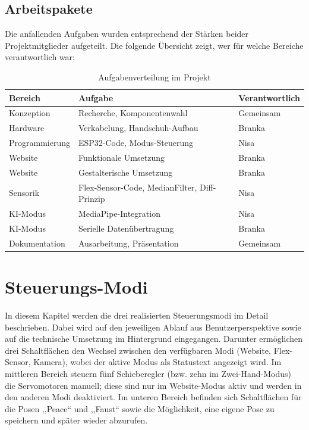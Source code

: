 \documentclass[12pt,a4paper]{article}
\begin{document}
\subsection{Arbeitspakete}
Die anfallenden Aufgaben wurden entsprechend der Stärken beider Projektmitglieder aufgeteilt. Die folgende Übersicht zeigt, wer für welche Bereiche verantwortlich war:

\begin{table}[h]
\centering
\begin{tabular}{|l|l|l|}
\hline
\textbf{Bereich} & \textbf{Aufgabe} & \textbf{Verantwortlich} \\
\hline
Konzeption & Recherche, Komponentenwahl & Gemeinsam \\
Hardware & Verkabelung, Handschuh-Aufbau & Branka \\
Programmierung & ESP32-Code, Modus-Steuerung & Nisa \\
Website & Funktionale Umsetzung & Branka \\
Website & Gestalterische Umsetzung & Branka \\
Sensorik & Flex-Sensor-Code, MedianFilter, Diff-Prinzip & Nisa \\
KI-Modus & MediaPipe-Integration & Nisa \\
KI-Modus & Serielle Datenübertragung & Branka \\
Dokumentation & Ausarbeitung, Präsentation & Gemeinsam \\
\hline
\end{tabular}
\caption{Aufgabenverteilung im Projekt}
\end{table}

\newpage

\section{Steuerungs-Modi}

In diesem Kapitel werden die drei realisierten Steuerungsmodi im Detail beschrieben. Dabei wird auf den jeweiligen Ablauf aus Benutzerperspektive sowie auf die technische Umsetzung im Hintergrund eingegangen.
Darunter ermöglichen drei Schaltflächen den Wechsel zwischen den verfügbaren Modi 
(Website, Flex-Sensor, Kamera), wobei der aktive Modus als Statustext angezeigt 
wird. Im mittleren Bereich steuern fünf Schieberegler (bzw. zehn im Zwei-Hand-Modus) 
die Servomotoren manuell; diese sind nur im Website-Modus aktiv und werden in den 
anderen Modi deaktiviert. Im unteren Bereich befinden sich Schaltflächen für die 
Posen ,,Peace`` und ,,Faust`` sowie die Möglichkeit, eine eigene Pose zu speichern 
und später wieder abzurufen.
\end{document}
